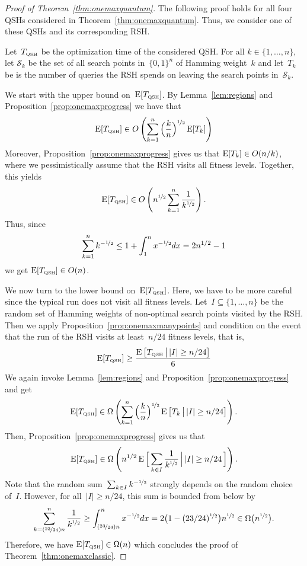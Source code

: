 \documentclass[a4paper,11pt]{article}
\begin{document}
\begin{proof}[Proof of Theorem~\ref{thm:onemaxquantum}]
The following proof holds for all four QSHs considered in Theorem~\ref{thm:onemaxquantum}. Thus, we consider one of these QSHs and its corresponding RSH. 

Let~$T_{\text{\tiny\rm QSH}}$ be the optimization time of the considered QSH. For all $k\in\{1,\dots,n\}$, let $\mathcal{S}_k$ be the set of all search points in~$\{0,1\}^n$ of Hamming weight~$k$ and let~$T_k$ be is the number of queries the RSH spends on leaving the search points in~$\mathcal{S}_k$. 

We start with the upper bound on~$\operatorname{E}[T_{\text{\tiny\rm QSH}}]$. By Lemma~\ref{lem:regions} and Proposition~\ref{prop:onemaxprogress} we have that
\[
\operatorname{E}[T_{\text{\tiny\rm QSH}}] \in{O}\left(\sum_{k=1}^n\Big(\frac{k}{n}\Big)^{\nicefrac{1}{2}}\operatorname{E}[T_k]\right)
\]
Moreover, Proposition~\ref{prop:onemaxprogress} gives us that $\operatorname{E}[T_k]\in{O}(n/k)$, where we pessimistically assume that the RSH visits all fitness levels. Together, this yields
\[
\operatorname{E}[T_{\text{\tiny\rm QSH}}]\in{O}\left(n^{\nicefrac{1}{2}}\sum_{k=1}^{n}\frac{1}{k^{\nicefrac{1}{2}}}\right).
\]
Thus, since
\[
\sum_{k=1}^n k^{-\nicefrac{1}{2}}\le 1+\int_1^{n}x^{-\nicefrac{1}{2}}dx=2n^{1/2}-1
\]
we get $\operatorname{E}[T_{\text{\tiny\rm QSH}}]\in{O}(n)$.

We now turn to the lower bound on~$\operatorname{E}[T_{\text{\tiny\rm QSH}}]$. Here, we have to be more careful since the typical run does not visit all fitness levels. Let~$I\subseteq\{1,\dots,n\}$ be the random set of Hamming weights of non-optimal search points visited by the RSH. Then we apply Proposition~\ref{prop:onemaxmanypoints} and condition on the event that the run of the RSH visits at least~$n/24$ fitness levels, that is,
\[
\operatorname{E}[T_{\text{\tiny\rm QSH}}]\ge\frac{\operatorname{E}\big[T_{\text{\tiny\rm QSH}}\,\big|\, |I|\ge n/24\big]}{6}
\]
We again invoke Lemma~\ref{lem:regions} and Proposition~\ref{prop:onemaxprogress} and get
\[
\operatorname{E}[T_{\text{\tiny\rm QSH}}]\in\Omega\left(\sum_{k=1}^n\Big(\frac{k}{n}\Big)^{\nicefrac{1}{2}}\operatorname{E}\big[T_k\,\big|\, |I|\ge n/24\big]\right).
\]
Then, Proposition~\ref{prop:onemaxprogress} gives us that
\[
\operatorname{E}[T_{\text{\tiny\rm QSH}}]\in\Omega\left(n^{1/2}\operatorname{E}\Big[\sum_{k\in I}\frac{1}{k^{\nicefrac{1}{2}}}\,\Big|\,|I|\ge n/24\,\Big]\right).
\]
Note that the random sum~$\sum_{k\in I}k^{-\nicefrac{1}{2}}$ strongly depends on the random choice of~$I$. However, for all~$|I|\ge n/24$, this sum is bounded from below by
\[
\sum_{k=(\nicefrac{23}{24})n}^n\frac{1}{k^{\nicefrac{1}{2}}}\ge\int_{(\nicefrac{23}{24})n}^{n}x^{-\nicefrac{1}{2}}dx=2\big(1-(23/24)^{\nicefrac{1}{2}}\big)n^{\nicefrac{1}{2}}\in\Omega\big(n^{\nicefrac{1}{2}}\big).
\]
Therefore, we have $\operatorname{E}[T_{\text{\tiny\rm QSH}}]\in\Omega(n)$ which concludes the proof of Theorem~\ref{thm:onemaxclassic}.
\end{proof}
\end{document}
